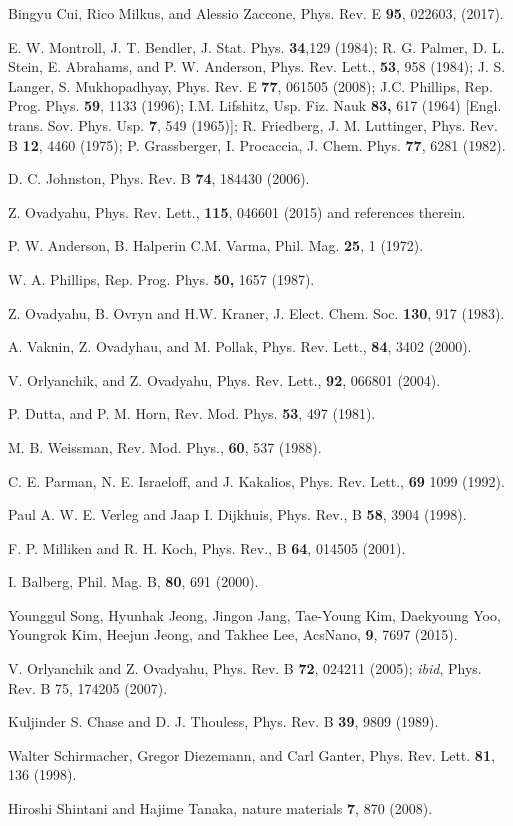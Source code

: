 \documentclass
[preprint,showpacs,byrevtex,10pt,twocolumn,tightenlines,prl,letterpaper]{revtex4}%
\begin{document}
\begin{thebibliography}{99}
Bingyu Cui, Rico Milkus, and Alessio Zaccone, Phys. Rev. E
\textbf{95}, 022603, (2017).

E. W. Montroll, J. T. Bendler, J. Stat. Phys. \textbf{34},129
(1984); R. G. Palmer, D. L. Stein, E. Abrahams, and P. W. Anderson, Phys. Rev.
Lett., \textbf{53}, 958 (1984); J. S. Langer, S. Mukhopadhyay, Phys. Rev. E
\textbf{77}, 061505 (2008); J.C. Phillips, Rep. Prog. Phys. \textbf{59}, 1133
(1996); I.M. Lifshitz, Usp. Fiz. Nauk \textbf{83,} 617 (1964) [Engl. trans.
Sov. Phys. Usp. \textbf{7}, 549 (1965)]; R. Friedberg, J. M. Luttinger, Phys.
Rev. B \textbf{12}, 4460 (1975); P. Grassberger, I. Procaccia, J. Chem. Phys.
\textbf{77}, 6281 (1982).

D. C. Johnston, Phys. Rev. B \textbf{74}, 184430 (2006).

Z. Ovadyahu, Phys. Rev. Lett., \textbf{115}, 046601 (2015) and
references therein.

P. W. Anderson, B. Halperin C.M. Varma, Phil. Mag. \textbf{25}, 1 (1972).

W. A. Phillips, Rep. Prog. Phys. \textbf{50,} 1657 (1987).

Z. Ovadyahu, B. Ovryn and H.W. Kraner, J. Elect. Chem. Soc.
\textbf{130}, 917 (1983).

A. Vaknin, Z. Ovadyhau, and M. Pollak, Phys. Rev. Lett.,
\textbf{84}, 3402 (2000).

V. Orlyanchik, and Z. Ovadyahu, Phys. Rev. Lett., \textbf{92},
066801 (2004).

P. Dutta, and P. M. Horn, Rev. Mod. Phys. \textbf{53}, 497 (1981).

M. B. Weissman, Rev. Mod. Phys., \textbf{60}, 537 (1988).

C. E. Parman, N. E. Israeloff, and J. Kakalios, Phys. Rev. Lett.,
\textbf{69} 1099 (1992).

Paul A. W. E. Verleg and Jaap I. Dijkhuis, Phys. Rev., B
\textbf{58}, 3904 (1998).

F. P. Milliken and R. H. Koch, Phys. Rev., B \textbf{64}, 014505 (2001).

I. Balberg, Phil. Mag. B, \textbf{80}, 691 (2000).

Younggul Song, Hyunhak Jeong, Jingon Jang, Tae-Young Kim,
Daekyoung Yoo, Youngrok Kim, Heejun Jeong, and Takhee Lee, AcsNano,
\textbf{9}, 7697 (2015).

V. Orlyanchik and Z. Ovadyahu, Phys. Rev. B \textbf{72}, 024211
(2005); \textit{ibid}, Phys. Rev. B 75, 174205 (2007).

Kuljinder S. Chase and D. J. Thouless, Phys. Rev. B \textbf{39},
9809 (1989).

Walter Schirmacher, Gregor Diezemann, and Carl Ganter, Phys. Rev.
Lett. \textbf{81}, 136 (1998).

Hiroshi Shintani and Hajime Tanaka, nature materials \textbf{7},
870 (2008).
\end{thebibliography}
\end{document}
